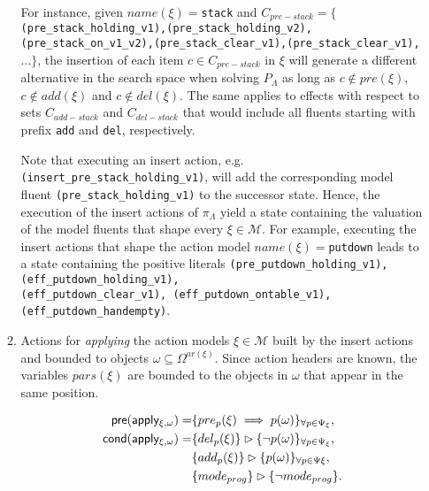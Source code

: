 \documentclass[runningheads]{llncs}
\newcommand{\pre}{\mathsf{pre}}     %
\newcommand{\cond}{\mathsf{cond}}   %
\begin{document}
\begin{itemize}
\begin{enumerate}
For instance, given $name(\xi)=${\tt{\small stack}} and $C_{pre-stack}=\{${\tt{\small (pre\_stack\_holding\_v1),(pre\_stack\_holding\_v2), (pre\_stack\_on\_v1\_v2),(pre\_stack\_clear\_v1),(pre\_stack\_clear\_v1),}}$\ldots \}$, the insertion of each item $c \in C_{pre-stack}$ in $\xi$ will generate a different alternative in the search space when solving $P_{\Lambda}$ as long as $c \notin pre(\xi)$,  $c \notin add(\xi)$ and $c \notin del(\xi)$. The same applies to effects with respect to sets $C_{add-stack}$ and $C_{del-stack}$ that would include all fluents starting with prefix  {\tt{\small add}} and {\tt{\small del}}, respectively.

\vspace{0.1cm}

Note that executing an insert action, e.g.{\tt{\small (insert\_pre\_stack\_holding\_v1)}}, will add the corresponding model fluent {\tt{\small (pre\_stack\_holding\_v1)}} to the successor state. Hence, the execution of the insert actions of $\pi_\Lambda$ yield a state containing the valuation of the model fluents that shape every $\xi \in \mathcal{M}$. For example, executing the insert actions that shape the action model $name(\xi)=${\tt{\small putdown}} leads to a state containing the positive literals {\tt{\small (pre\_putdown\_holding\_v1),(eff\_putdown\_holding\_v1),\\ (eff\_putdown\_clear\_v1),
(eff\_putdown\_ontable\_v1),(eff\_putdown\_handempty)}}.

\item Actions for {\em applying} the action models $\xi\in\mathcal{M}$ built by the insert actions and bounded to objects $\omega\subseteq\Omega^{ar(\xi)}$. Since action headers are known, the variables $pars(\xi)$ are bounded to the objects in $\omega$ that appear in the same position.


\begin{small}
\begin{align*}
\hspace*{7pt}\pre(\mathsf{apply_{\xi,\omega}})=&\{pre_{p}(\xi)\implies p(\omega)\}_{\forall p\in\Psi_\xi},\\
\cond(\mathsf{apply_{\xi,\omega}})=&\{del_{p}(\xi)\}\rhd\{\neg p(\omega)\}_{\forall p\in\Psi_\xi},\\
&\{add_{p}(\xi)\}\rhd\{p(\omega)\}_{\forall p\in\Psi\xi},\\
&\{mode_{prog}\}\rhd\{\neg mode_{prog}\}.
\end{align*}
\end{small}


\end{enumerate}
\end{itemize}
\end{document}
